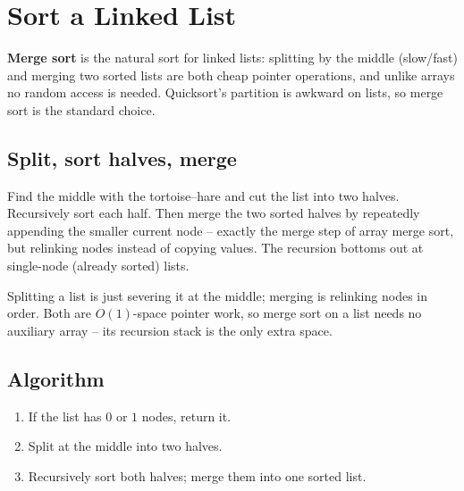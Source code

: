 \section{Sort a Linked List}
\label{sec:ll-sort-list}


\begin{patternbox}
\textbf{Merge sort} is the natural sort for linked lists: splitting by the
middle (slow/fast) and merging two sorted lists are both cheap pointer
operations, and unlike arrays no random access is needed. Quicksort's
partition is awkward on lists, so merge sort is the standard choice.
\end{patternbox}

\subsection*{Split, sort halves, merge}

Find the middle with the tortoise--hare and cut the list into two halves.
Recursively sort each half. Then merge the two sorted halves by repeatedly
appending the smaller current node -- exactly the merge step of array merge
sort, but relinking nodes instead of copying values. The recursion bottoms
out at single-node (already sorted) lists.

\begin{ideabox}
Splitting a list is just severing it at the middle; merging is relinking
nodes in order. Both are $O(1)$-space pointer work, so merge sort on a list
needs no auxiliary array -- its recursion stack is the only extra space.
\end{ideabox}

\subsection*{Algorithm}

\begin{enumerate}
  \item If the list has $0$ or $1$ nodes, return it.
  \item Split at the middle into two halves.
  \item Recursively sort both halves; merge them into one sorted list.
\end{enumerate}


